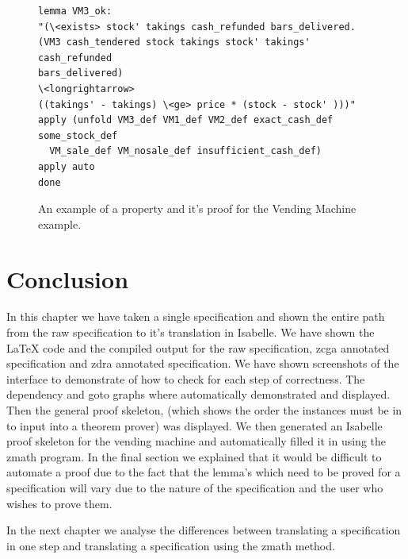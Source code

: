 \begin{figure}[H]
\centering
\begin{scriptsize}
\begin{BVerbatim}
lemma VM3_ok:
"(\<exists> stock' takings cash_refunded bars_delivered.
(VM3 cash_tendered stock takings stock' takings' cash_refunded
bars_delivered)
\<longrightarrow>
((takings' - takings) \<ge> price * (stock - stock' )))"
apply (unfold VM3_def VM1_def VM2_def exact_cash_def some_stock_def
  VM_sale_def VM_nosale_def insufficient_cash_def)
apply auto
done
\end{BVerbatim}
\end{scriptsize}
\caption{An example of a property and it's proof for the Vending Machine example. \label{fig:propertyproof}}
\end{figure}

\section{Conclusion}
In this chapter we have taken a single specification and shown the entire path from the raw specification to it's translation in Isabelle. We have shown the \LaTeX{} code and the compiled output for the raw specification, \gls{zcga} annotated specification and \gls{zdra} annotated specification. We have shown screenshots of the interface to demonstrate of how to check for each step of correctness. The dependency and goto graphs where automatically demonstrated and displayed. Then the general proof skeleton, (which shows the order the instances must be in to input into a theorem prover) was displayed. We then generated an Isabelle proof skeleton for the vending machine and automatically filled it in using the \gls{zmath} program. In the final section we explained that it would be difficult to automate a proof due to the fact that the lemma's which need to be proved for a specification will vary due to the nature of the specification and the user who wishes to prove them. 

In the next chapter we analyse the differences between translating a specification in one step and translating a specification using the \gls{zmath} method.